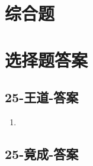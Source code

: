 \documentclass[12pt, a4paper, oneside, UTF8]{ctexbook}
\begin{document}
\section{综合题}

\newpage

\section{选择题答案}
\subsection{25-王道-答案}
\begin{enumerate}
    \item 
\end{enumerate}
\subsection{25-竟成-答案}
\end{document}

